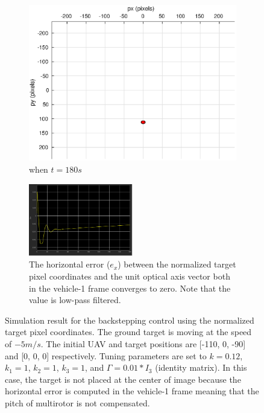 \begin{figure}[htbp]
\begin{subfigure}[t]{0.32\linewidth}
		\includegraphics[width=\textwidth]{images/chapter4/image_camera_-5mps_180s}
		\caption{when $t=180s$}
	\end{subfigure}	
	\begin{subfigure}[t]{0.8\linewidth}
		\centering
		\includegraphics[width=0.5\textwidth]{images/chapter4/image_Ex_-5mps}
		\caption{The horizontal error ($e_x$) between the normalized target pixel coordinates and the unit optical axis vector both in the vehicle-1 frame converges to zero. Note that the value is low-pass filtered.}
	\end{subfigure}	
	\caption{Simulation result for the backstepping control using the normalized target pixel coordinates. The ground target is moving at the speed of $-5m/s$. The initial UAV and target positions are [-110, 0, -90] and [0, 0, 0] respectively. Tuning parameters are set to $k=0.12$, $k_1=1$, $k_2=1$, $k_3=1$, and $\Gamma=0.01*I_3$ (identity matrix). In this case, the target is not placed at the center of image because the horizontal error is computed in the vehicle-1 frame meaning that the pitch of multirotor is not compensated.}
	\label{image_-5mps}
\end{figure}
